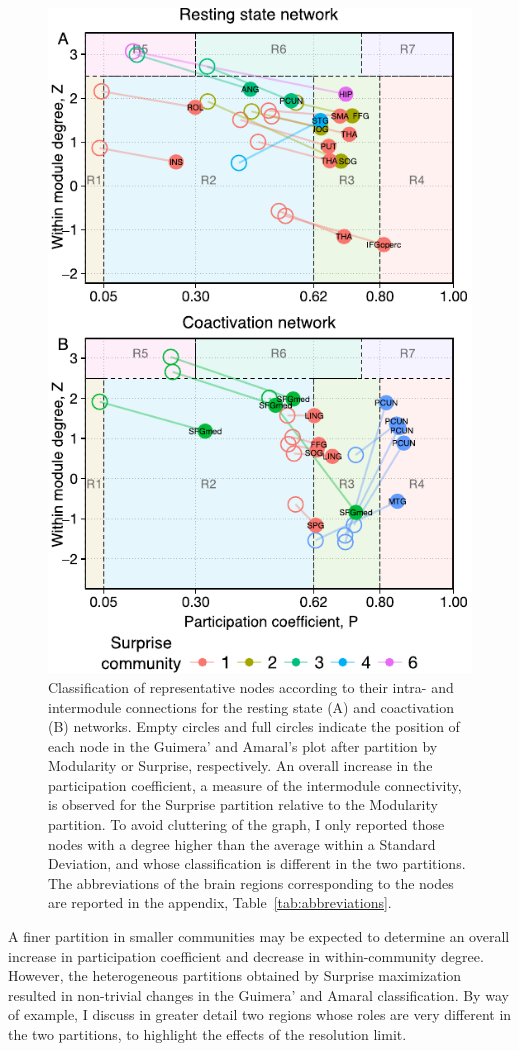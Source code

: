 \begin{figure}[ht!]
\centering
\includegraphics[width=0.5\linewidth]{images/figure_6_ga_rs_coact.pdf}
\caption{Classification of representative nodes according to their intra- and intermodule connections for the resting state (A) and coactivation (B) networks. Empty circles and full circles indicate the position of each node in the Guimera' and Amaral’s plot after partition by Modularity or Surprise, respectively. An overall increase in the participation coefficient, a measure of the intermodule connectivity, is observed for the Surprise partition relative to the Modularity partition. To avoid cluttering of the graph, I only reported those nodes with a degree higher than the average within a Standard Deviation, and whose classification is different in the two partitions. The abbreviations of the brain regions corresponding to the nodes are reported in the appendix, Table~\ref{tab:abbreviations}.}
\label{fig:figure_6_ga_rs_coact}
\end{figure}

A finer partition in smaller communities may be expected to determine an overall increase in participation coefficient and decrease in within-community degree. However, the heterogeneous partitions obtained by Surprise maximization resulted in non-trivial changes in the Guimera' and Amaral classification. By way of example, I discuss in greater detail two regions whose roles are very different in the two partitions, to highlight the effects of the resolution limit.

